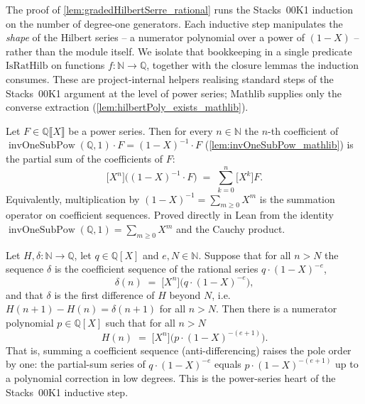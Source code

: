 The proof of \cref{lem:gradedHilbertSerre_rational} runs the Stacks~00K1 induction
on the number of degree-one generators. Each inductive step manipulates the
\emph{shape} of the Hilbert series -- a numerator polynomial over a power of
\((1-X)\) -- rather than the module itself. We isolate that bookkeeping in a
single predicate \(\mathrm{IsRatHilb}\) on functions \(f : \mathbb{N} \to
\mathbb{Q}\), together with the closure lemmas the induction consumes. These are
project-internal helpers realising standard steps of the Stacks~00K1 argument at
the level of power series; Mathlib supplies only the converse extraction
(\cref{lem:hilbertPoly_exists_mathlib}).

\begin{lemma}
  \label{lem:coeff_invOneSubPow_one_mul}
  Let \(F \in \mathbb{Q}\llbracket X\rrbracket\) be a power series. Then for every
  \(n \in \mathbb{N}\) the \(n\)-th coefficient of
  \(\operatorname{invOneSubPow}(\mathbb{Q}, 1)\cdot F = (1-X)^{-1}\cdot F\)
  (\cref{lem:invOneSubPow_mathlib}) is the partial sum of the coefficients of
  \(F\):
  \[
    \bigl[X^n\bigr]\bigl((1-X)^{-1}\cdot F\bigr)
    \;=\; \sum_{k=0}^{n} \bigl[X^k\bigr] F .
  \]
  Equivalently, multiplication by \((1-X)^{-1} = \sum_{m\ge 0} X^m\) is the
  summation operator on coefficient sequences. Proved directly in Lean from the
  identity \(\operatorname{invOneSubPow}(\mathbb{Q},1) = \sum_{m\ge 0} X^m\) and
  the Cauchy product.
\end{lemma}

\begin{lemma}
  \label{lem:rationalHilbert_antidiff}
  Let \(H, \delta : \mathbb{N} \to \mathbb{Q}\), let \(q \in \mathbb{Q}[X]\) and
  \(e, N \in \mathbb{N}\). Suppose that for all \(n > N\) the sequence \(\delta\)
  is the coefficient sequence of the rational series \(q\cdot(1-X)^{-e}\),
  \[
    \delta(n) \;=\; \bigl[X^n\bigr]\bigl(q\cdot(1-X)^{-e}\bigr),
  \]
  and that \(\delta\) is the first difference of \(H\) beyond \(N\), i.e.
  \(H(n+1) - H(n) = \delta(n+1)\) for all \(n > N\). Then there is a numerator
  polynomial \(p \in \mathbb{Q}[X]\) such that for all \(n > N\)
  \[
    H(n) \;=\; \bigl[X^n\bigr]\bigl(p\cdot(1-X)^{-(e+1)}\bigr).
  \]
  That is, summing a coefficient sequence (anti-differencing) raises the pole
  order by one: the partial-sum series of \(q\cdot(1-X)^{-e}\) equals
  \(p\cdot(1-X)^{-(e+1)}\) up to a polynomial correction in low degrees. This is
  the power-series heart of the Stacks~00K1 inductive step.
\end{lemma}

